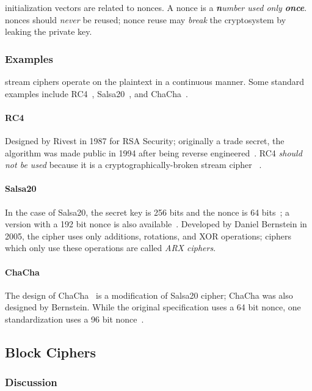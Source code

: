 \Glspl{initialization vector} are related to \glspl{nonce}.
A \gls{nonce} is a \emph{\textbf{n}umber used only \textbf{once}}.
\Glspl{nonce} should \emph{never} be reused;
\gls{nonce} reuse may \emph{break} the cryptosystem by leaking the private key.

\subsubsection{Examples}

\Glspl{stream cipher} operate on the plaintext in a continuous manner.
Some standard examples include RC4~\cite{rivest2016spritz},
Salsa20~\cite{salsa20}, and ChaCha~\cite{chacha}.

\paragraph{RC4}
Designed by Rivest in 1987 for RSA Security;
originally a trade secret, the algorithm was made public in 1994 after being
reverse engineered~\cite{rivest2016spritz}.
RC4 \emph{should not be used} because it is a cryptographically-broken
\gls{stream cipher}%
~\cite{rfc7465,rivest2016spritz,sen2014non,mantin2002practical,%
alfardan2013security,alfardan2013full}.

\paragraph{Salsa20}
In the case of Salsa20, the secret key is 256 bits
and the \gls{nonce} is 64 bits~\cite{salsa20};
a version with a 192 bit \gls{nonce} is also available~\cite{xsalsa20}.
Developed by Daniel Bernstein in 2005,
the cipher uses only additions, rotations, and XOR operations;
ciphers which only use these operations are called \emph{ARX ciphers}.

\paragraph{ChaCha}
The design of ChaCha~\cite{chacha} is a modification of Salsa20 cipher;
ChaCha was also designed by Bernstein.
While the original specification uses a 64 bit nonce,
one standardization uses a 96 bit nonce~\cite{rfc8439}.


\subsection{Block Ciphers}
\label{ssec:block_cipher}

\subsubsection{Discussion}

